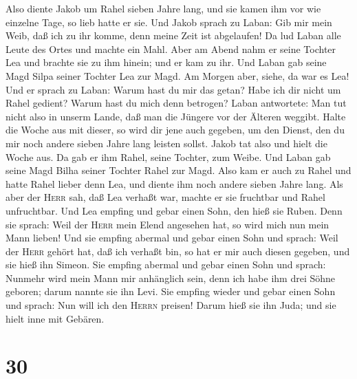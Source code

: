  Also diente Jakob um Rahel sieben Jahre lang, und sie
kamen ihm vor wie einzelne Tage, so lieb hatte er sie. 
Und Jakob sprach zu Laban: Gib mir mein Weib, daß ich zu ihr komme, denn
meine Zeit ist abgelaufen!  Da lud Laban alle Leute des
Ortes und machte ein Mahl.  Aber am Abend nahm er seine
Tochter Lea und brachte sie zu ihm hinein; und er kam zu ihr.
 Und Laban gab seine Magd Silpa seiner Tochter Lea zur
Magd.  Am Morgen aber, siehe, da war es Lea! Und er
sprach zu Laban: Warum hast du mir das getan? Habe ich dir nicht um
Rahel gedient? Warum hast du mich denn betrogen?  Laban
antwortete: Man tut nicht also in unserm Lande, daß man die Jüngere vor
der Älteren weggibt.  Halte die Woche aus mit dieser, so
wird dir jene auch gegeben, um den Dienst, den du mir noch andere sieben
Jahre lang leisten sollst.  Jakob tat also und hielt die
Woche aus. Da gab er ihm Rahel, seine Tochter, zum Weibe.
 Und Laban gab seine Magd Bilha seiner Tochter Rahel zur
Magd.  Also kam er auch zu Rahel und hatte Rahel lieber
denn Lea, und diente ihm noch andere sieben Jahre lang. 
Als aber der \textsc{Herr} sah, daß Lea verhaßt war, machte er sie
fruchtbar und Rahel unfruchtbar.  Und Lea empfing und
gebar einen Sohn, den hieß sie Ruben. Denn sie sprach: Weil der
\textsc{Herr} mein Elend angesehen hat, so wird mich nun mein Mann
lieben!  Und sie empfing abermal und gebar einen Sohn und
sprach: Weil der \textsc{Herr} gehört hat, daß ich verhaßt bin, so hat
er mir auch diesen gegeben, und sie hieß ihn Simeon.  Sie
empfing abermal und gebar einen Sohn und sprach: Nunmehr wird mein Mann
mir anhänglich sein, denn ich habe ihm drei Söhne geboren; darum nannte
sie ihn Levi.  Sie empfing wieder und gebar einen Sohn
und sprach: Nun will ich den \textsc{Herrn} preisen! Darum hieß sie ihn
Juda; und sie hielt inne mit Gebären.

\hypertarget{section-29}{%
\section{30}\label{section-29}}

